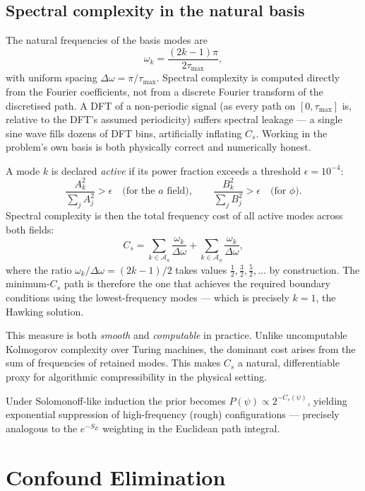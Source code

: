 \documentclass[11pt]{article}
\begin{document}
\subsection{Spectral complexity in the natural basis}

The natural frequencies of the basis modes are
\[
\omega_k = \frac{(2k-1)\pi}{2\tau_{\max}},
\]
with uniform spacing \(\Delta\omega = \pi/\tau_{\max}\).
Spectral complexity is computed directly from the Fourier coefficients,
not from a discrete Fourier transform of the discretised path.
A DFT of a non-periodic signal (as every path on \([0,\tau_{\max}]\) is, relative to the DFT's assumed periodicity) suffers spectral leakage — a single sine wave fills dozens of DFT bins, artificially inflating \(C_s\).
Working in the problem's own basis is both physically correct and numerically honest.

A mode \(k\) is declared \emph{active} if its power fraction exceeds a threshold \(\epsilon = 10^{-4}\):
\[
\frac{A_k^2}{\sum_{j} A_j^2} > \epsilon \quad \text{(for the } a \text{ field)}, \qquad \frac{B_k^2}{\sum_{j} B_j^2} > \epsilon \quad \text{(for } \phi\text{)}.
\]
Spectral complexity is then the total frequency cost of all active modes across both fields:
\[
C_s = \sum_{k \in \mathcal{A}_a} \frac{\omega_k}{\Delta\omega} + \sum_{k \in \mathcal{A}_\phi} \frac{\omega_k}{\Delta\omega},
\]
where the ratio \(\omega_k/\Delta\omega = (2k-1)/2\) takes values \(\tfrac{1}{2},
\tfrac{3}{2}, \tfrac{5}{2}, \ldots\) by construction.
The minimum-\(C_s\) path is therefore the one that achieves the required boundary conditions using the lowest-frequency modes — which is precisely \(k=1\), the Hawking solution.

This measure is both \emph{smooth} and \emph{computable} in practice. Unlike uncomputable Kolmogorov
complexity \cite{kolmogorov1965} over Turing machines, the dominant cost arises from the sum of
frequencies of retained modes. This makes \(C_s\) a natural, differentiable proxy for algorithmic
compressibility in the physical setting.

Under Solomonoff-like induction the prior becomes \(P(\psi) \propto 2^{-C_s(\psi)}\), yielding exponential
suppression of high-frequency (rough) configurations — precisely analogous to the \(e^{-S_E}\) weighting in the
Euclidean path integral.

\section{Confound Elimination}
\end{document}
